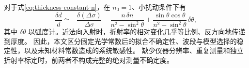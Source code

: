 对于式\eqref{eq:thickness-constant-n}，在 $n_0=1$、小扰动条件下有
\begin{equation}
 \frac{\delta d}{d}\simeq-\frac{\delta(\Delta\sigma)}{\Delta\sigma}
 -\frac{n\,\delta n}{n^2-\sin^2\theta}
 +\frac{\sin\theta\cos\theta}{n^2-\sin^2\theta}\,\delta\theta,
 \label{eq:relative-sensitivity}
\end{equation}
其中 $\delta\theta$ 以弧度计。近法向入射时，折射率的相对变化几乎等比例、反方向地传递到厚度。
因此，本文区分固定光学常数后的拟合不确定性、波段与模型选择的稳定性，以及未知材料常数造成的系统敏感性。
缺少仪器分辨率、重复测量和独立折射率标定时，前两者不构成完整的绝对测量不确定度\cite{JCGM2008}。
